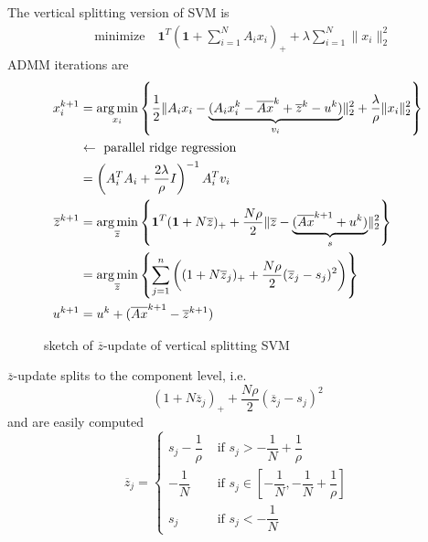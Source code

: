 The vertical splitting version of SVM is
\begin{align*}
    & \text{minimize} \quad \mathbf{1}^T (\mathbf{1} + \sum\limits_{i=1}^N A_ix_i)_+ + \lambda \sum\limits_{i=1}^N \lVert x_i \rVert_2^2
\end{align*}
ADMM iterations are
\begin{align*}
    x_i^{k+1} & = \operatorname*{arg\,min}_{x_i} \left\{ \dfrac{1}{2} \lVert A_ix_i - \underbrace{(A_ix_i^k - \overline{Ax}^k + \overline{z}^k - u^k)}_{v_i} \rVert_2^2 + \dfrac{\lambda}{\rho} \lVert x_i \rVert_2^2 \right\} \\
    & \leftarrow \text{ parallel ridge regression} \\
    &  = \left( A_i^TA_i + \dfrac{2\lambda}{\rho}I \right)^{-1} A_i^T v_i \\
    \overline{z}^{k+1} & = \operatorname*{arg\,min}\limits_{\overline{z}} \left\{ \mathbf{1}^T (\mathbf{1} + N\overline{z})_+ + \dfrac{N\rho}{2} \lVert \overline{z} - \underbrace{(\overline{Ax}^{k+1} + u^k)}_{s} \rVert_2^2 \right\} \\
    & = \operatorname*{arg\,min}\limits_{\overline{z}} \left\{ \sum\limits_{j=1}^n \left( (1+N\overline{z}_j)_+ + \dfrac{N\rho}{2}(\overline{z}_j-s_j)^2 \right) \right\} \\
    u^{k+1} & = u^k + (\overline{Ax}^{k+1}-\overline{z}^{k+1})
\end{align*}

\begin{figure}[H]
\centering
{}
\caption{sketch of $\overline{z}$-update of vertical splitting SVM}
\end{figure}

$\overline{z}$-update splits to the component level, i.e.
$$(1+N\overline{z}_j)_+ + \dfrac{N\rho}{2}(\overline{z}_j-s_j)^2$$
and are easily computed
$$\overline{z}_j = \begin{cases}
    s_j - \dfrac{1}{\rho} & \text{ if } s_j > -\dfrac{1}{N} + \dfrac{1}{\rho} \\
    -\dfrac{1}{N} & \text{ if } s_j \in [-\dfrac{1}{N}, -\dfrac{1}{N} + \dfrac{1}{\rho}] \\
    s_j &  \text{ if } s_j < -\dfrac{1}{N}
\end{cases}
$$

